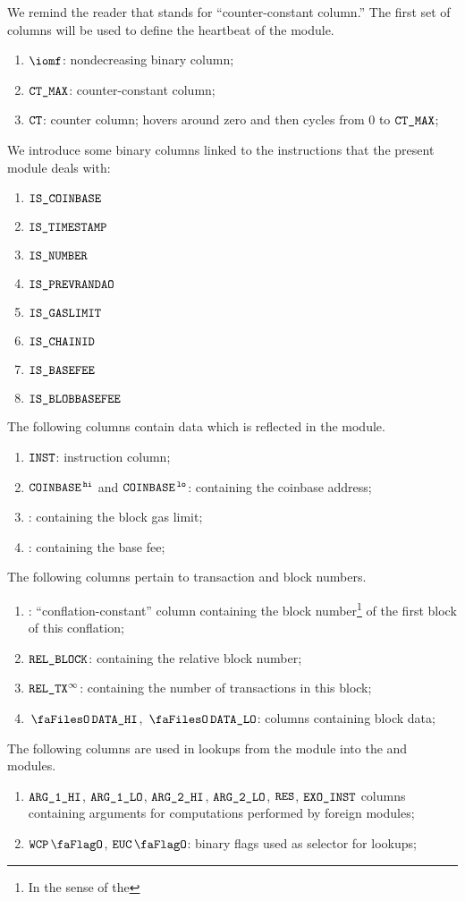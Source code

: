 We remind the reader that \ccc{} stands for ``counter-constant column.''
The first set of columns will be used to define the heartbeat of the \btcMod{} module.
\begin{enumerate}
	\item $\iomf$:
		nondecreasing binary column;
	\item $\texttt{CT\_MAX}$:
		counter-constant column;
	\item $\texttt{CT}$:
		counter column; hovers around zero and then cycles from $0$ to $\texttt{CT\_MAX}$;
\end{enumerate}
We introduce some binary columns linked to the instructions that the present module deals with:
\begin{multicols}{3}
	\begin{enumerate}[resume]
		\item $\texttt{IS\_COINBASE}$
		\item $\texttt{IS\_TIMESTAMP}$
		\item $\texttt{IS\_NUMBER}$
		\item $\texttt{IS\_PREVRANDAO}$
		\item $\texttt{IS\_GASLIMIT}$
		\item $\texttt{IS\_CHAINID}$
		\item $\texttt{IS\_BASEFEE}$
		\item $\texttt{IS\_BLOBBASEFEE}$
	\end{enumerate}
\end{multicols}
\noindent The following columns contain data which is reflected in the \txnDataMod{} module.
\begin{enumerate}[resume, start=13]
	\item $\texttt{INST}$:
		instruction column;
	\item $\texttt{COINBASE}^{\mathtt{\,hi}}$ and $\texttt{COINBASE}^{\mathtt{\,lo}}$:
		\ccc{} containing the
		coinbase address;
	\item \blockGasLimit{}:
		\ccc{} containing the
		block gas limit;
	\item \basefee{}:
		\ccc{} containing the
		base fee;
\end{enumerate}
The following columns pertain to transaction and block numbers.
\begin{enumerate}[resume]
	\item \blockNumberOfFirstBlockInConflation{}:
		``conflation-constant'' column containing the block number\footnote{In the sense of the \evm{}} of the first block of this conflation;
	\item $\texttt{REL\_BLOCK}$:
		\ccc{} containing the relative block number;
	\item $\texttt{REL\_TX}^\infty$:
		\ccc{} containing the number of transactions in this block;
	\item $\blockDataHi$, $\blockDataLo$:
		columns containing block data;
\end{enumerate}
The following columns are used in lookups from the \btcMod{} module into the \wcpMod{} and \eucMod{} modules.
\begin{enumerate}[resume]
	\item $\texttt{ARG}\texttt{\_1}\texttt{\_HI}$, $\texttt{ARG}\texttt{\_1}\texttt{\_LO}$, $\texttt{ARG}\texttt{\_2}\texttt{\_HI}$, $\texttt{ARG}\texttt{\_2}\texttt{\_LO}$, $\texttt{RES}$, $\texttt{EXO\_}\texttt{INST}$
		columns containing arguments for computations performed by foreign modules;
	\item $\wcpFlag$, $\eucFlag$:
		binary flags used as selector for lookups;
\end{enumerate}
